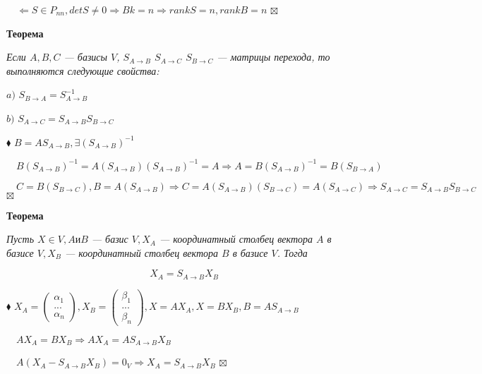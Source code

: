 \documentclass[a4paper, 12pt]{report}
\begin{document}
	$\quad \Leftarrow S \in P_{nn}, detS \ne 0 \Rightarrow Bk = n \Rightarrow rankS = n, rankB = n$ $\boxtimes$
	\par\bigskip
	\textbf{Теорема}
	
	\textit{Если $A, B, C$ --- базисы $V$, $S_{A\rightarrow B}$ $S_{A\rightarrow C}$ $S_{B\rightarrow C}$ --- матрицы перехода, то выполняются следующие свойства: }
	
	$a)$ \textit{$S_{B\rightarrow A} = S_{A\rightarrow B}^{-1}$}
	
	$b)$ \textit{$S_{A\rightarrow C} = S_{A\rightarrow B}S_{B\rightarrow C}$}
	\par\bigskip
	$\blacklozenge$ $B = AS_{A\rightarrow B}, \exists (S_{A \rightarrow B})^{-1}$
	
	$\quad B(S_{A\rightarrow B})^{-1} = A(S_{A\rightarrow B})(S_{A\rightarrow B})^{-1} = A \Rightarrow A = B(S_{A\rightarrow B})^{-1} = B(S_{B\rightarrow A})$
	\par\bigskip
	$\quad C = B(S_{B\rightarrow C}), B = A(S_{A\rightarrow B}) \Rightarrow C = A(S_{A\rightarrow B})(S_{B\rightarrow C}) = A(S_{A\rightarrow C}) \Rightarrow S_{A\rightarrow C} = S_{A\rightarrow B}S_{B\rightarrow C}$ $\boxtimes$
	\par\bigskip
	\textbf{Теорема}
	
	\textit{Пусть $X \in V, A и B$ --- базис $V, X_{A}$ --- координатный столбец вектора $A$ в базисе $V, X_{B}$ --- координатный столбец вектора $B$ в базисе $V$. Тогда}
	
	\textit{$$X_{A} = S_{A \rightarrow B}X_{B}$$}
	\par\bigskip
	$\blacklozenge$ $X_{A} = \begin{pmatrix} \alpha_{1}
		\\ ...
		\\ \alpha_{n}
	\end{pmatrix}, X_{B} = \begin{pmatrix} \beta_{1}
		\\ ...
		\\ \beta_{n}
	\end{pmatrix}, X = AX_{A}, X = BX_{B}, B = AS_{A \rightarrow B}$
	
	$\quad AX_{A} = BX_{B} \Rightarrow AX_{A} = AS_{A \rightarrow B}X_{B}$
	
	$\quad A(X_{A} - S_{A \rightarrow B}X_{B}) = 0_{V} \Rightarrow X_{A} = S_{A \rightarrow B}X_{B}$ $\boxtimes$
	
	
	
	
	
	
	
\end{document}
